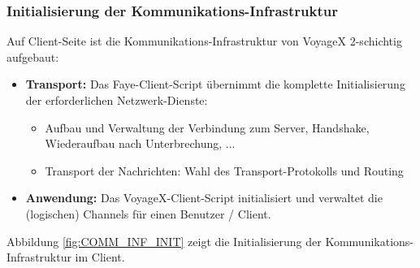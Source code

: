 \subsubsection{Initialisierung der Kommunikations-Infrastruktur}
Auf Client-Seite ist die Kommunikations-Infrastruktur von VoyageX 2-schichtig aufgebaut:
\begin{itemize}[leftmargin=*,noitemsep,topsep=1ex,parsep=0pt,partopsep=0pt]
\item \textbf{Transport:} Das Faye-Client-Script übernimmt die komplette Initialisierung der erforderlichen Netzwerk-Dienste:
	\begin{itemize}
		\item Aufbau und Verwaltung der Verbindung zum Server, Handshake, Wiederaufbau nach Unterbrechung, ...
		\item Transport der Nachrichten: Wahl des Transport-Protokolls und Routing
	\end{itemize}
\item \textbf{Anwendung:} Das VoyageX-Client-Script initialisiert und verwaltet die (logischen) Channels für einen Benutzer / Client.%
\end{itemize}
\enlargethispage{4\baselineskip} %
Abbildung \ref{fig:COMM_INF_INIT} zeigt die Initialisierung der Kommunikations-Infrastruktur im Client.
